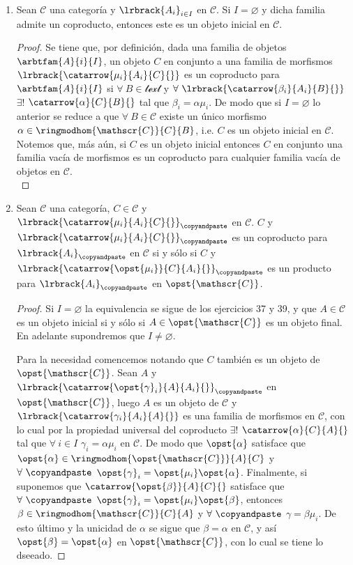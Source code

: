 \documentclass{article}
\begin{document}
\begin{enumerate}[label=\textbf{Ej \arabic*.}]
		\item Sean $\mathscr{C}$ una categoría y $\lrbrack{A_i}_{i\in I}$ en $\mathscr{C}$. Si $I=\varnothing$ y dicha familia admite un coproducto, entonces este es un objeto inicial en $\mathscr{C}$.
		\begin{proof}
			Se tiene que, por definición, dada una familia de objetos $\arbtfam{A}{i}{I}$, un objeto $C$ en conjunto a una familia de morfismos $\lrbrack{\catarrow{\mu_i}{A_i}{C}{}}$ es un coproducto para $\arbtfam{A}{i}{I}$ si $\forall\ B\in\mathscr{text}$ y $\forall\ \lrbrack{\catarrow{\beta_i}{A_i}{B}{}}$ $\exists !$ $\catarrow{\alpha}{C}{B}{}$ tal que $\beta_i=\alpha\mu_i$. De modo que si $I=\varnothing$ lo anterior se reduce a que $\forall\ B\in\mathscr{C}$ existe un único morfismo $\alpha\in\ringmodhom{\mathscr{C}}{C}{B}$, i.e. $C$ es un objeto inicial en $\mathscr{C}$.\\
			Notemos que, más aún, si $C$ es un objeto inicial entonces $C$ en conjunto una familia vacía de morfismos es un coproducto para cualquier familia vacía de objetos en $\mathscr{C}$.\\
		\end{proof}
		\item  Sean $\mathscr{C}$ una categoría, $C\in\mathscr{C}$ y $\lrbrack{\catarrow{\mu_i}{A_i}{C}{}}_{\copyandpaste}$ en $\mathscr{C}$.  $C$ y $\lrbrack{\catarrow{\mu_i}{A_i}{C}{}}_{\copyandpaste}$ es un coproducto para $\lrbrack{A_i}_{\copyandpaste}$ en $\mathscr{C}$ si y sólo si $C$ y $\lrbrack{\catarrow{\opst{\mu_i}}{C}{A_i}{}}_{\copyandpaste}$ es un producto para $\lrbrack{A_i}_{\copyandpaste}$ en $\opst{\mathscr{C}}$.
		\begin{proof}
			Si $I=\varnothing$ la equivalencia se sigue de los ejercicios 37 y 39, y que $A\in\mathscr{C}$ es un objeto inicial si y sólo si $A\in\opst{\mathscr{C}}$ es un objeto final. En adelante supondremos que $I\neq\varnothing$.
						
			Para la necesidad comencemos notando que $C$ también es un objeto de $\opst{\mathscr{C}}$. Sean $A$ y $\lrbrack{\catarrow{\opst{\gamma}_i}{A}{A_i}{}}_{\copyandpaste}$ en $\opst{\mathscr{C}}$, luego $A$ es un objeto de $\mathscr{C}$ y $\lrbrack{\catarrow{{\gamma}_i}{A_i}{A}{}}$ es una familia de morfismos en $\mathscr{C}$, con lo cual por la propiedad universal del coproducto $\exists !$ $\catarrow{\alpha}{C}{A}{}$ tal que $\forall\ i\in I$ $\gamma_i=\alpha\mu_i$ en $\mathscr{C}$. De modo que $\opst{\alpha}$ satisface que $\opst{\alpha}\in\ringmodhom{\opst{\mathscr{C}}}{A}{C}$ y $\forall\ \copyandpaste$ $\opst{\gamma}_i=\opst{\mu_i}\opst{\alpha}$. Finalmente, si suponemos que $\catarrow{\opst{\beta}}{A}{C}{}$ satisface que $\forall\ \copyandpaste$ $\opst{\gamma}_i=\opst{\mu_i}\opst{\beta}$, entonces $\beta\in\ringmodhom{\mathscr{C}}{C}{A}$ y $\forall\ \copyandpaste$ $\gamma=\beta\mu_i$. De esto último y la unicidad de $\alpha$ se sigue que ${\beta}={\alpha}$ en $\mathscr{C}$, y así  $\opst{\beta}=\opst{\alpha}$ en $\opst{\mathscr{C}}$, con lo cual se tiene lo dseeado.
			

\end{proof}
\end{enumerate}
\end{document}
